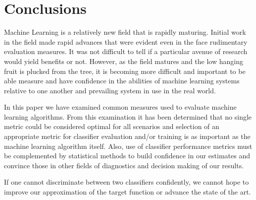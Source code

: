 \documentclass[10pt]{unbthesis}
\begin{document}
\section{Conclusions}
Machine Learning is a relatively new field that is rapidly
maturing. Initial work in the field made rapid advances that were
evident even in the face rudimentary evaluation measures. It was not
difficult to tell if a particular avenue of research would yield
benefits or not. However, as the field matures and the low hanging
fruit is plucked from the tree, it is becoming more difficult and
important to be able measure and have confidence in the abilities of
machine learning systems relative to one another and prevailing system
in use in the real world.

In this paper we have examined common measures used to evaluate
machine learning algorithms. From this examination it has been
determined that no single metric could be considered optimal for all
scenarios and selection of an appropriate metric for classifier
evaluation and/or training is as important as the machine learning
algorithm itself. Also, use of classifier performance metrics must be
complemented by statistical methods to build confidence in our
estimates and convince those in other fields of diagnostics and
decision making of our results.

If one cannot discriminate between two classifiers confidently, we
cannot hope to improve our approximation of the target function or
advance the state of the art.

\renewcommand{\bibname}{References}



\end{document}
